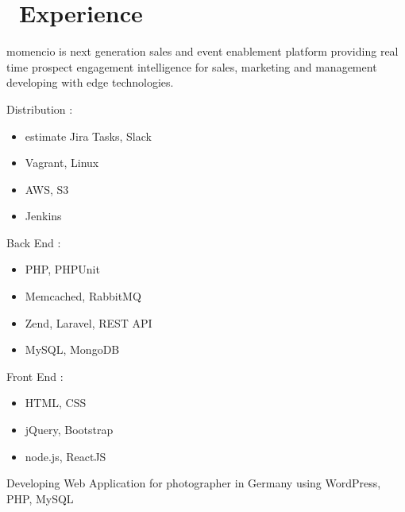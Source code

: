 \documentclass{resume}
\begin{document}



\section{\faUsers\ Experience}
momencio is next generation sales and event enablement platform providing real time prospect engagement intelligence for sales, marketing and management developing with edge technologies.
\begin{multicols}{3}
Distribution :
\begin{itemize}
  \item estimate Jira Tasks, Slack
  \item Vagrant, Linux
  \item AWS, S3
  \item Jenkins
\end{itemize}

\columnbreak

Back End :
\begin{itemize}
  \item PHP, PHPUnit
  \item Memcached, RabbitMQ
  \item Zend, Laravel, REST API
  \item MySQL, MongoDB
\end{itemize}

\columnbreak

Front End :
\begin{itemize}
  \item HTML, CSS
  \item jQuery, Bootstrap
  \item node.js, ReactJS
\end{itemize}
\end{multicols}

Developing Web Application for photographer in Germany using WordPress, PHP, MySQL
\end{document}
